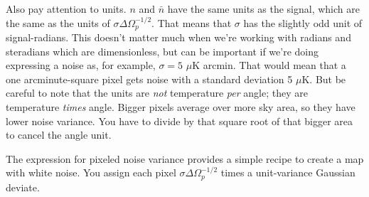Also pay attention to units.  $n$ and $\bar n$ have the same units as the signal, which are the same as the units of $\sigma \Delta\Omega_p^{-1/2}$.  That means that $\sigma$ has the slightly odd unit of signal-radians.  This doesn't matter much when we're working with radians and steradians which are  dimensionless, but can be important if we're doing expressing a noise as, for example, $\sigma = 5$ $\mu$K arcmin.  That would mean that a one arcminute-square pixel gets noise with a standard deviation  5 $\mu$K.  But be careful to note that the units are \textit{not} temperature \textit{per} angle; they are temperature \textit{times} angle.  Bigger pixels average over more sky area, so they have lower noise variance.  You have to divide by that square root of that bigger area to cancel the angle unit.

The expression for pixeled noise variance provides a simple recipe to create a map with white noise.  You assign each pixel $\sigma \Delta\Omega_p^{-1/2}$ times a unit-variance Gaussian deviate.

